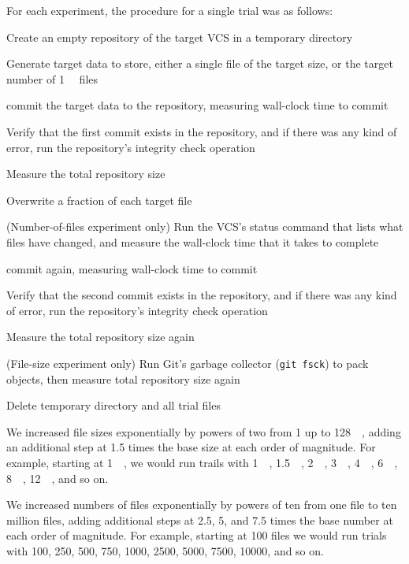 For each experiment, the procedure for a single trial was as follows:
\begin{tight_enumerate}
    \item Create an empty \gls{repository} of the target \gls{VCS} in a temporary directory
    \item Generate target data to store, either a single file of the target size, or the target number of \SI{1}{\kibi\byte} files
    \item \Gls{commit} the target data to the \gls{repository}, measuring wall-clock time to \gls{commit}
    \item Verify that the first \gls{commit} exists in the \gls{repository}, and if there was any kind of error, run the \gls{repository}'s integrity check operation
    \item Measure the total \gls{repository} size
    \item Overwrite a fraction of each target file
    \item (Number-of-files experiment only) Run the \gls{VCS}'s status command that lists what files have changed, and measure the wall-clock time that it takes to complete
    \item \Gls{commit} again, measuring wall-clock time to \gls{commit}
    \item Verify that the second \gls{commit} exists in the \gls{repository}, and if there was any kind of error, run the \gls{repository}'s integrity check operation
    \item Measure the total \gls{repository} size again
    \item (File-size experiment only) Run Git's garbage collector (\lstinline{git fsck}) to pack objects, then measure total \gls{repository} size again
    \item Delete temporary directory and all trial files
\end{tight_enumerate}

We increased file sizes exponentially by powers of two from \SI{1}{\byte} up to \SI{128}{\gibi\byte}, adding an additional step at \num{1.5} times the base size at each order of magnitude.
For example, starting at \SI{1}{\mebi\byte}, we would run trails with \SI{1}{\mebi\byte}, \SI{1.5}{\mebi\byte}, \SI{2}{\mebi\byte}, \SI{3}{\mebi\byte}, \SI{4}{\mebi\byte}, \SI{6}{\mebi\byte}, \SI{8}{\mebi\byte}, \SI{12}{\mebi\byte}, and so on.

We increased numbers of files exponentially by powers of ten from one file to ten million files, adding additional steps at \num{2.5}, \num{5}, and \num{7.5} times the base number at each order of magnitude.
For example, starting at \num{100} files we would run trials with \num{100}, \num{250}, \num{500}, \num{750}, \num{1000}, \num{2500}, \num{5000}, \num{7500}, \num{10000}, and so on.

